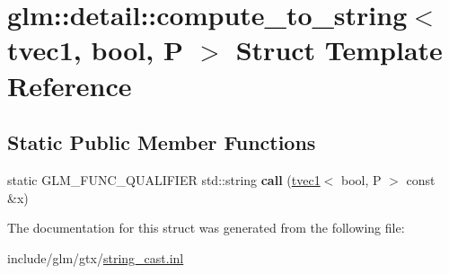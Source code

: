 \hypertarget{structglm_1_1detail_1_1compute__to__string_3_01tvec1_00_01bool_00_01P_01_4}{}\section{glm\+:\+:detail\+:\+:compute\+\_\+to\+\_\+string$<$ tvec1, bool, P $>$ Struct Template Reference}
\label{structglm_1_1detail_1_1compute__to__string_3_01tvec1_00_01bool_00_01P_01_4}
\subsection*{Static Public Member Functions}
\begin{DoxyCompactItemize}
\item 
\mbox{\label{structglm_1_1detail_1_1compute__to__string_3_01tvec1_00_01bool_00_01P_01_4_aea165ad1c3cf2cf3339182c54d28ae1a}} 
static G\+L\+M\+\_\+\+F\+U\+N\+C\+\_\+\+Q\+U\+A\+L\+I\+F\+I\+ER std\+::string {\bfseries call} (\hyperlink{structglm_1_1tvec1}{tvec1}$<$ bool, P $>$ const \&x)
\end{DoxyCompactItemize}


The documentation for this struct was generated from the following file\+:\begin{DoxyCompactItemize}
\item 
include/glm/gtx/\hyperlink{string__cast_8inl}{string\+\_\+cast.\+inl}\end{DoxyCompactItemize}

